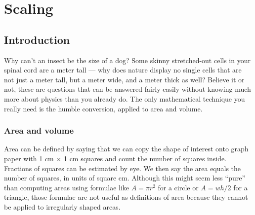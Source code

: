 \chapter{Scaling}
\label{ch:scaling}


\section{Introduction}\label{sec:intro-to-scaling}
\vspace{1.5mm}

Why can't an insect be the size of a dog? Some skinny
stretched-out cells in your spinal cord are a meter tall ---
why does nature display no single cells that are not just a
meter tall, but a meter wide, and a meter thick as well?
Believe it or not, these are questions that can be answered
fairly easily without knowing much more about physics than
you already do. The only mathematical technique you really
need is the humble conversion, applied to area and volume.



\subsection{Area and volume}

Area can be defined by saying that we can copy the shape of
interest onto graph paper with 1 cm $\times$ 1 cm squares and
count the number of squares inside. Fractions of squares can
be estimated by eye. We then say the area equals the number
of squares, in units of square cm. Although this might seem
less ``pure'' than computing areas using formulae like
$A=\pi r^2$ for a circle or $A=wh/2$ for a triangle,
those formulae are not useful as definitions of area because
they cannot be applied to irregularly shaped areas.

